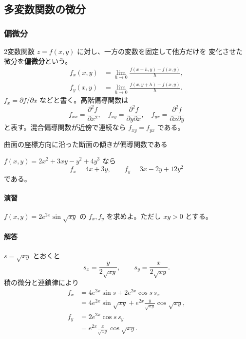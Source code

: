 \subsection{多変数関数の微分}

\subsubsection{偏微分}

2変数関数 $z=f(x,y)$ に対し、一方の変数を固定して他方だけを
変化させた微分を\textbf{偏微分}という。
\begin{align}
 f_x(x,y)&=\lim_{h\to0}\frac{f(x+h,y)-f(x,y)}h,\\
 f_y(x,y)&=\lim_{h\to0}\frac{f(x,y+h)-f(x,y)}h.
\end{align}
$f_x=\partial f/\partial x$ などと書く。高階偏導関数は
\[
 f_{xx}=\frac{\partial^2f}{\partial x^2},\quad
 f_{xy}=\frac{\partial^2f}{\partial y\partial x},\quad
 f_{yx}=\frac{\partial^2f}{\partial x\partial y}
\]
と表す。混合偏導関数が近傍で連続なら $f_{xy}=f_{yx}$ である。

\begin{center}

\small 曲面の座標方向に沿った断面の傾きが偏導関数である
\end{center}

\begin{example}
$f(x,y)=2x^2+3xy-y^2+4y^3$ なら
\[
 f_x=4x+3y,\qquad f_y=3x-2y+12y^2
\]
である。
\end{example}

\paragraph{演習}
$f(x,y)=2e^{2x}\sin\sqrt{xy}$ の $f_x,f_y$ を求めよ。ただし $xy>0$
とする。

\paragraph{解答}
$s=\sqrt{xy}$ とおくと
\[
 s_x=\frac{y}{2\sqrt{xy}},\qquad
 s_y=\frac{x}{2\sqrt{xy}}.
\]
積の微分と連鎖律により
\begin{align*}
 f_x
 &=4e^{2x}\sin s+2e^{2x}\cos s\,s_x\\
 &=4e^{2x}\sin\sqrt{xy}
   +e^{2x}\frac{y}{\sqrt{xy}}\cos\sqrt{xy},\\
 f_y
 &=2e^{2x}\cos s\,s_y\\
 &=e^{2x}\frac{x}{\sqrt{xy}}\cos\sqrt{xy}.
\end{align*}

